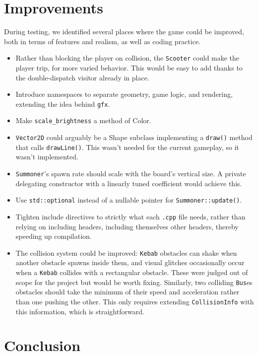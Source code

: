 \documentclass{article}
\begin{document}
\section{Improvements} \label{sec: improvements}

During testing, we identified several places where the game could be improved, both in terms of features and realism, as well as coding practice.

\begin{itemize}
    \item Rather than blocking the player on collision, the \texttt{Scooter} could make the player trip, for more varied behavior. This would be easy to add thanks to the double-dispatch visitor already in place.
    \item Introduce namespaces to separate geometry, game logic, and rendering, extending the idea behind \texttt{gfx}.
    \item Make \texttt{scale\_brightness} a method of Color.
    \item \texttt{Vector2D} could arguably be a Shape subclass implementing a \texttt{draw()} method that calls \texttt{drawLine()}. This wasn't needed for the current gameplay, so it wasn't implemented.
    \item \texttt{Summoner}'s spawn rate should scale with the board's vertical size. A private delegating constructor with a linearly tuned coefficient would achieve this.
    \item Use \texttt{std::optional} instead of a nullable pointer for \texttt{Summoner::update()}.
    \item Tighten include directives to strictly what each \texttt{.cpp} file needs, rather than relying on including headers, including themselves other headers, thereby speeding up compilation.
    \item The collision system could be improved: \texttt{Kebab} obstacles can shake when another obstacle spawns inside them, and visual glitches occasionally occur when a \texttt{Kebab} collides with a rectangular obstacle. These were judged out of scope for the project but would be worth fixing. Similarly, two colliding \texttt{Bus}es obstacles should take the minimum of their speed and acceleration rather than one pushing the other. This only requires extending \texttt{CollisionInfo} with this information, which is straightforward.
\end{itemize}

\section{Conclusion} \label{sec: conclusion}
\end{document}
